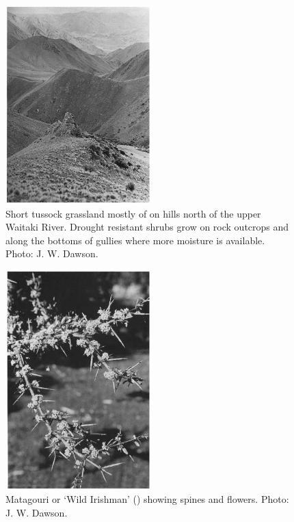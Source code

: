 \begin{figure}
	\includegraphics[width=0.5\textwidth]{graphics/figure82short-tussock.jpg}
	\centering
	\caption[Short tussock grassland mostly of Festuca novae-zelandiae]{Short tussock grassland mostly of  on hills north of the upper Waitaki River.
    Drought resistant shrubs grow on rock outcrops and along the bottoms of gullies where more moisture is available.  Photo:  J. W. Dawson.}
	\label{fig:82short-tussock}
\end{figure}

\begin{figure}
	\includegraphics[width=0.5\textwidth]{graphics/figure83matagouri.jpg}
	\centering
	\caption[Matagouri]{Matagouri or `Wild Irishman' () showing spines and flowers.
    Photo:  J. W. Dawson.}
	\label{fig:83matagouri}
\end{figure}

